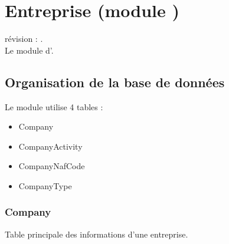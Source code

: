

\clearpage
\section{Entreprise (module \company)}

révision : .\\
Le module \company d'\obm.\\

\subsection{Organisation de la base de données}

Le module \company utilise 4 tables :
\begin{itemize}
 \item Company
 \item CompanyActivity
 \item CompanyNafCode
 \item CompanyType
\end{itemize}

\subsubsection{Company}
Table principale des informations d'une entreprise. \\

